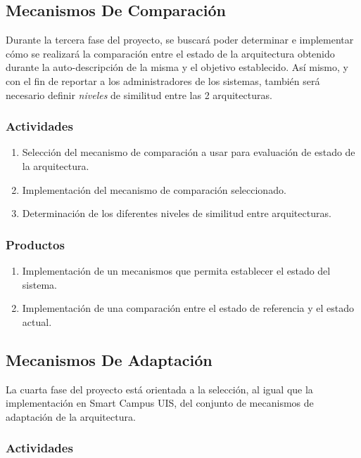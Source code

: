 \subsection{Mecanismos De Comparación}

Durante la tercera fase del proyecto, se buscará poder determinar e implementar cómo se realizará la comparación entre el estado de la arquitectura obtenido durante la auto-descripción de la misma y el objetivo establecido. Así mismo, y con el fin de reportar a los administradores de los sistemas, también será necesario definir \textit{niveles} de similitud entre las 2 arquitecturas.

\subsubsection*{Actividades}

\begin{enumerate}
    \itemsep-2mm
    \item Selección del mecanismo de comparación a usar para evaluación de estado de la arquitectura.
    \item Implementación del mecanismo de comparación seleccionado.
    \item Determinación de los diferentes niveles de similitud entre arquitecturas.
\end{enumerate}    

\subsubsection*{Productos}

\begin{enumerate}
    \itemsep-2mm
    \item Implementación de un mecanismos que permita establecer el estado del sistema.
    \item Implementación de una comparación entre el estado de referencia y el estado actual.
\end{enumerate}

\subsection{Mecanismos De Adaptación}

La cuarta fase del proyecto está orientada a la selección, al igual que la implementación en Smart Campus UIS, del conjunto de mecanismos de adaptación de la arquitectura. 

\subsubsection*{Actividades}

